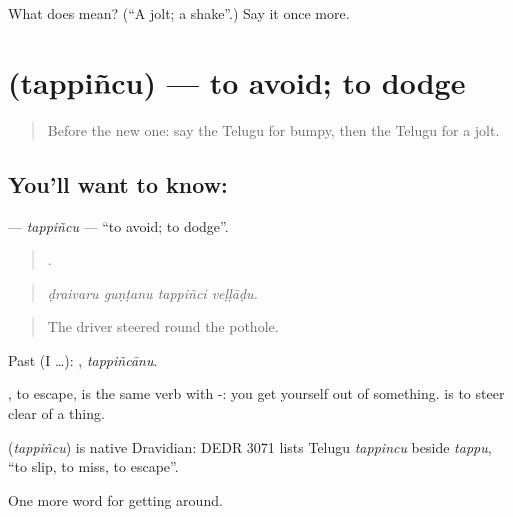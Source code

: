 \begin{tcolorbox}[breakable,colback=teal!4,colframe=teal!35!black,title={Before you move on}]
What does  mean? (\textquotedblleft{}A jolt; a shake\textquotedblright{}.) Say it once more.
\end{tcolorbox}
\section[\texorpdfstring{\te{తప్పించు} (tappiñcu)}{తప్పించు (tappiñcu)}]{ (tappiñcu) — to avoid; to dodge}

\label{lesson:TE-C446-tappincu}



\begin{quote}
Before the new one: say the Telugu for bumpy, then the Telugu for a jolt.
\end{quote}

\subsection*{You'll want to know: }
\textbf{} — \emph{tappiñcu} — \textquotedblleft{}to avoid; to dodge\textquotedblright{}.

\begin{quote}
   .
\end{quote}

\begin{quote}
\emph{ḍraivaru guṇṭanu tappiñci veḷḷāḍu.}
\end{quote}

\begin{quote}
The driver steered round the pothole.
\end{quote}

Past (I …): , \emph{tappiñcānu}.

, to escape, is the same verb with -: you get yourself out of something.  is to steer clear of a thing.

\begin{cousinweb}
\textbf{} (\emph{tappiñcu}) is native Dravidian: DEDR 3071 lists Telugu \emph{tappincu} beside \emph{tappu}, \textquotedblleft{}to slip, to miss, to escape\textquotedblright{}.
\end{cousinweb}

\begin{grammarlens}[title={What you've built}]
One more word for getting around.
\end{grammarlens}

